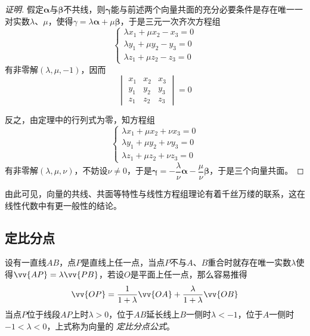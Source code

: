 \begin{proof}[证明]
假定$\bm{\alpha}$与$\bm{\beta}$不共线，则$\bm{\gamma}$能与前述两个向量共面的充分必要条件是存在唯一一对实数$\lambda$、$\mu$，使得$\gamma=\lambda \bm{\alpha} + \mu \bm{\beta}$，于是三元一次齐次方程组
\[
  \left\{
    \begin{array}{lll}
      \lambda x_1 + \mu x_2 - x_3 = 0  \\
      \lambda y_1 + \mu y_2 - y_3 = 0 \\
      \lambda z_1 + \mu z_2 - z_3 = 0
    \end{array}
    \right.
\]
有非零解$(\lambda, \mu, -1)$，因而
\[
  \begin{vmatrix}
    x_1 & x_2 & x_3\\
    y_1 & y_2 & y_3 \\
    z_1 & z_2 & z_3 
  \end{vmatrix}
  = 0
\]

反之，由定理中的行列式为零，知方程组
\[
  \left\{
    \begin{array}{lll}
      \lambda x_1 + \mu x_2 + \nu x_3 = 0  \\
      \lambda y_1 + \mu y_2 + \nu y_3 = 0 \\
      \lambda z_1 + \mu z_2 + \nu z_3 = 0
    \end{array}
    \right.
\]
有非零解$(\lambda, \mu, \nu)$，不妨设$\nu \neq 0$，于是$\bm{\gamma} = -\dfrac{\lambda}{\nu} \bm{\alpha} - \dfrac{\mu}{\nu} \bm{\beta}$，于是三个向量共面。
\end{proof}

由此可见，向量的共线、共面等特性与线性方程组理论有着千丝万缕的联系，这在线性代数中有更一般性的结论。



\subsection{定比分点}
\label{sec:definition-proportion}

设有一直线$AB$，点$P$是直线上任一点，当点$P$不与$A$、$B$重合时就存在唯一实数$\lambda$使得$\vv{AP}=\lambda\vv{PB}$，若设$O$是平面上任一点，那么容易推得
\begin{equation}
  \label{eq:vector-definition-proportion}
  \vv{OP} = \frac{1}{1+\lambda} \vv{OA} + \frac{\lambda}{1+\lambda} \vv{OB}
\end{equation}
当点$P$位于线段$AP$上时$\lambda>0$，位于$AB$延长线上$B$一侧时$\lambda<-1$，位于$A$一侧时$-1<\lambda<0$，上式称为向量的 \emph{定比分点公式}。


